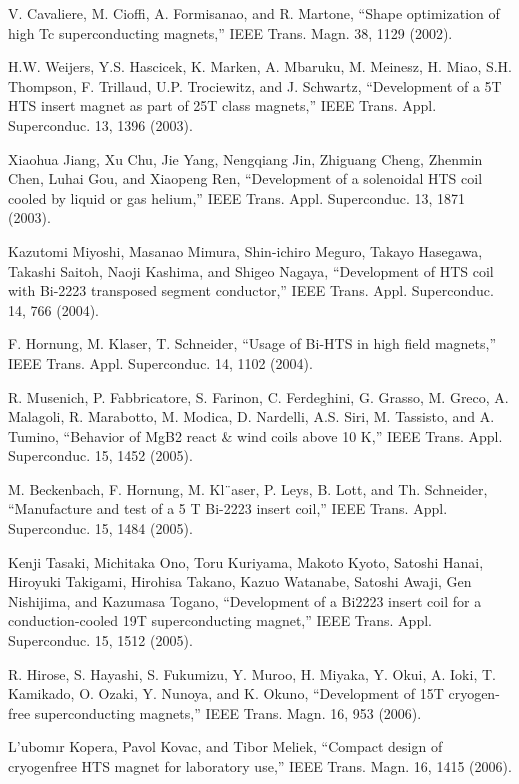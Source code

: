 \noindent [9.358] V. Cavaliere, M. Cioffi, A. Formisanao, and R. Martone, ``Shape optimization of
high Tc superconducting magnets,” IEEE Trans. Magn. 38, 1129 (2002).

\noindent [9.359] H.W. Weijers, Y.S. Hascicek, K. Marken, A. Mbaruku, M. Meinesz, H. Miao,
S.H. Thompson, F. Trillaud, U.P. Trociewitz, and J. Schwartz, ``Development
of a 5T HTS insert magnet as part of 25T class magnets,” IEEE Trans. Appl.
Superconduc. 13, 1396 (2003).

\noindent [9.360] Xiaohua Jiang, Xu Chu, Jie Yang, Nengqiang Jin, Zhiguang Cheng, Zhenmin
Chen, Luhai Gou, and Xiaopeng Ren, ``Development of a solenoidal HTS coil
cooled by liquid or gas helium,” IEEE Trans. Appl. Superconduc. 13, 1871 (2003).

\noindent [9.361] Kazutomi Miyoshi, Masanao Mimura, Shin-ichiro Meguro, Takayo Hasegawa,
Takashi Saitoh, Naoji Kashima, and Shigeo Nagaya, ``Development of HTS coil
with Bi-2223 transposed segment conductor,” IEEE Trans. Appl. Superconduc.
14, 766 (2004).

\noindent [9.362] F. Hornung, M. Klaser, T. Schneider, ``Usage of Bi-HTS in high field magnets,”
IEEE Trans. Appl. Superconduc. 14, 1102 (2004).

\noindent [9.363] R. Musenich, P. Fabbricatore, S. Farinon, C. Ferdeghini, G. Grasso, M. Greco,
A. Malagoli, R. Marabotto, M. Modica, D. Nardelli, A.S. Siri, M. Tassisto, and
A. Tumino, ``Behavior of MgB2 react \& wind coils above 10 K,” IEEE Trans.
Appl. Superconduc. 15, 1452 (2005).

\noindent [9.364] M. Beckenbach, F. Hornung, M. Kl¨aser, P. Leys, B. Lott, and Th. Schneider,
``Manufacture and test of a 5 T Bi-2223 insert coil,” IEEE Trans. Appl. Superconduc.
15, 1484 (2005).

\noindent [9.365] Kenji Tasaki, Michitaka Ono, Toru Kuriyama, Makoto Kyoto, Satoshi Hanai,
Hiroyuki Takigami, Hirohisa Takano, Kazuo Watanabe, Satoshi Awaji, Gen
Nishijima, and Kazumasa Togano, ``Development of a Bi2223 insert coil for a
conduction-cooled 19T superconducting magnet,” IEEE Trans. Appl. Superconduc.
15, 1512 (2005).

\noindent [9.366] R. Hirose, S. Hayashi, S. Fukumizu, Y. Muroo, H. Miyaka, Y. Okui, A. Ioki,
T. Kamikado, O. Ozaki, Y. Nunoya, and K. Okuno, ``Development of 15T
cryogen-free superconducting magnets,” IEEE Trans. Magn. 16, 953 (2006).

\noindent [9.367] L’ubomır Kopera, Pavol Kovac, and Tibor Meliek, ``Compact design of cryogenfree
HTS magnet for laboratory use,” IEEE Trans. Magn. 16, 1415 (2006).

